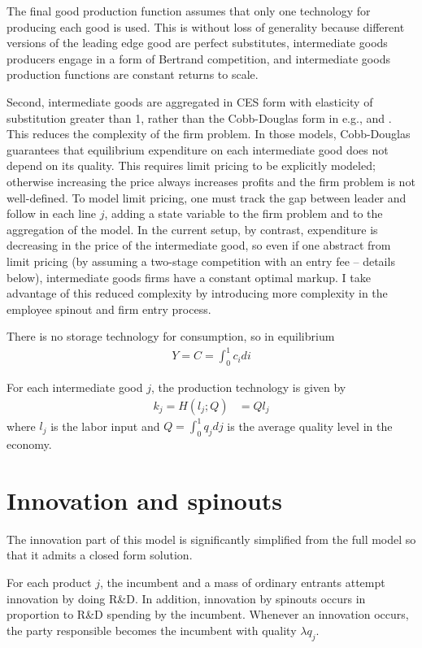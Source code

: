 \documentclass[12pt,english]{article}
\theoremstyle{remark}
\begin{document}
The final good production function assumes that only one technology for producing each good is used. This is without loss of generality because different versions of the leading edge good are perfect substitutes, intermediate goods producers engage in a form of Bertrand competition, and intermediate goods production functions are constant returns to scale. 

Second, intermediate goods are aggregated in CES form with elasticity of substitution greater than 1, rather than the Cobb-Douglas form in e.g., \cite{grossman_quality_1991} and \cite{baslandze_spinout_2019}. This reduces the complexity of the firm problem. In those models, Cobb-Douglas guarantees that equilibrium expenditure on each intermediate good does not depend on its quality. This requires limit pricing to be explicitly modeled; otherwise increasing the price always increases profits and the firm problem is not well-defined. To model limit pricing, one must track the gap between leader and follow in each line $j$, adding a state variable to the firm problem and to the aggregation of the model. In the current setup, by contrast, expenditure is decreasing in the price of the intermediate good, so even if one abstract from limit pricing (by assuming a two-stage competition with an entry fee -- details below), intermediate goods firms have a constant optimal markup. I take advantage of this reduced complexity by introducing more complexity in the employee spinout and firm entry process.

There is no storage technology for consumption, so in equilibrium
\begin{align*}
Y = C = \int_0^1 c_i di
\end{align*}

For each intermediate good $j$, the production technology is given by
\begin{align*}
k_j = H(l_j;Q) &= Q l_j
\end{align*}
where $l_j$ is the labor input and $Q = \int_0^1 q_j dj$ is the average quality level in the economy. 

\section{Innovation and spinouts}

The innovation part of this model is significantly simplified from the full model so that it admits a closed form solution. 

For each product $j$, the incumbent and a mass of ordinary entrants attempt innovation by doing R\&D. In addition, innovation by spinouts occurs in proportion to R\&D spending by the incumbent. Whenever an innovation occurs, the party responsible becomes the incumbent with quality $\lambda q_j$. 
\end{document}
